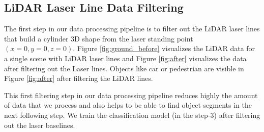 %
%
%


\subsection{LiDAR Laser Line Data Filtering}
The first step in our data processing pipeline is to filter out the LiDAR laser lines that build
a cylinder 3D shape from the laser standing point $(x=0, y=0, z=0)$. Figure \ref{fig:ground_before} visualizes the LiDAR data for a single scene with LiDAR laser lines and Figure \ref{fig:after} visualizes the data after
filtering out the Laser lines. Objects like car or pedestrian are
visible in Figure \ref{fig:after} after filtering the LiDAR lines.

This first filtering step in our data processing pipeline reduces highly the amount of data that we process and
also helps to be able to find object segments in the next following step.
We train 
the classification model (in the step-3) after 
filtering out the laser baselines.


